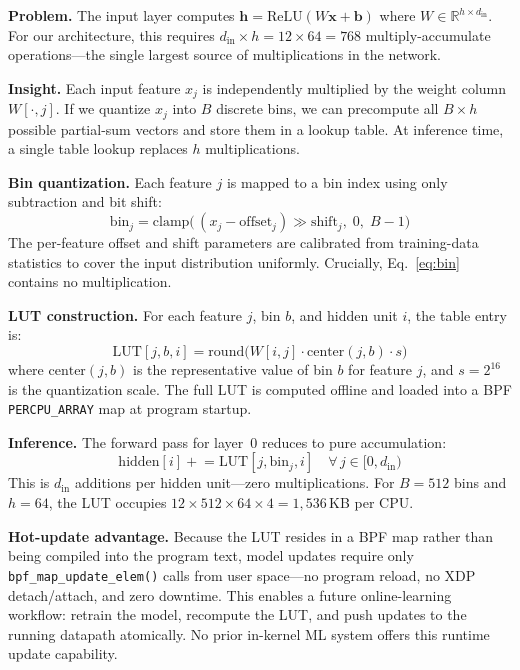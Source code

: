 \documentclass[sigconf,nonacm]{acmart}
\begin{document}
\textbf{Problem.}
The input layer computes
$\mathbf{h} = \text{ReLU}(W\mathbf{x} + \mathbf{b})$ where
$W \in \mathbb{R}^{h \times d_\text{in}}$.
For our architecture, this requires
$d_\text{in} \times h = 12 \times 64 = 768$ multiply-accumulate
operations---the single largest source of multiplications in the
network.

\textbf{Insight.}
Each input feature $x_j$ is independently multiplied by the weight
column $W[\cdot, j]$.
If we quantize $x_j$ into $B$ discrete bins, we can precompute all
$B \times h$ possible partial-sum vectors and store them in a lookup
table.
At inference time, a single table lookup replaces $h$ multiplications.

\textbf{Bin quantization.}
Each feature $j$ is mapped to a bin index using only subtraction and
bit shift:
\begin{equation}\label{eq:bin}
\text{bin}_j = \text{clamp}\!\bigl(\,(x_j - \text{offset}_j)
\gg \text{shift}_j,\; 0,\; B{-}1\bigr)
\end{equation}
The per-feature offset and shift parameters are calibrated from
training-data statistics to cover the input distribution uniformly.
Crucially, Eq.~\eqref{eq:bin} contains no multiplication.

\textbf{LUT construction.}
For each feature $j$, bin $b$, and hidden unit $i$, the table entry is:
\begin{equation}\label{eq:lut}
\text{LUT}[j, b, i] = \text{round}\!\bigl(W[i,j] \cdot
\text{center}(j, b) \cdot s\bigr)
\end{equation}
where $\text{center}(j, b)$ is the representative value of bin $b$ for
feature $j$, and $s = 2^{16}$ is the quantization scale.
The full LUT is computed offline and loaded into a BPF
\texttt{PERCPU\_ARRAY} map at program startup.

\textbf{Inference.}
The forward pass for layer~0 reduces to pure accumulation:
\begin{equation}\label{eq:lutinfer}
\text{hidden}[i] \mathrel{+}= \text{LUT}[j, \text{bin}_j, i]
\quad \forall\, j \in [0, d_\text{in})
\end{equation}
This is $d_\text{in}$ additions per hidden unit---zero multiplications.
For $B = 512$ bins and $h = 64$, the LUT occupies
$12 \times 512 \times 64 \times 4 = 1{,}536$\,KB per CPU.

\textbf{Hot-update advantage.}
Because the LUT resides in a BPF map rather than being compiled into
the program text, model updates require only
\texttt{bpf\_map\_update\_elem()} calls from user space---no program
reload, no XDP detach/attach, and zero downtime.
This enables a future online-learning workflow: retrain the model,
recompute the LUT, and push updates to the running datapath atomically.
No prior in-kernel ML system offers this runtime update capability.
\end{document}

